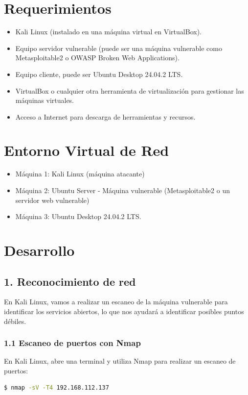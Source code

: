 \documentclass[12pt,a4paper]{article}
\begin{document}
\section{Requerimientos}
\begin{itemize}
    \item Kali Linux (instalado en una máquina virtual en VirtualBox).
    \item Equipo servidor vulnerable (puede ser una máquina vulnerable como Metasploitable2 o OWASP Broken Web Applications).
    \item Equipo cliente, puede ser Ubuntu Desktop 24.04.2 LTS.
    \item VirtualBox o cualquier otra herramienta de virtualización para gestionar las máquinas virtuales.
    \item Acceso a Internet para descarga de herramientas y recursos.
\end{itemize}

\section{Entorno Virtual de Red}
\begin{itemize}
    \item Máquina 1: Kali Linux (máquina atacante)
    \item Máquina 2: Ubuntu Server - Máquina vulnerable (Metasploitable2 o un servidor web vulnerable)
    \item Máquina 3: Ubuntu Desktop 24.04.2 LTS.
\end{itemize}

\section{Desarrollo}
\subsection{1. Reconocimiento de red}
En Kali Linux, vamos a realizar un escaneo de la máquina vulnerable para identificar los servicios abiertos, lo que nos ayudará a identificar posibles puntos débiles.

\subsubsection{1.1 Escaneo de puertos con Nmap}
En Kali Linux, abre una terminal y utiliza Nmap para realizar un escaneo de puertos:

\begin{lstlisting}[language=bash, caption=Escaneo básico con Nmap]
$ nmap -sV -T4 192.168.112.137
\end{lstlisting}
\end{document}

